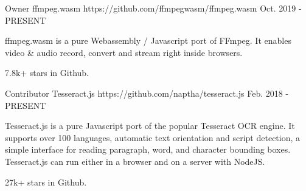 

\begin{cventries}

  \cventry
    {Owner} %
    {ffmpeg.wasm} %
    {https://github.com/ffmpegwasm/ffmpeg.wasm} %
    {Oct. 2019 - PRESENT} %
    {
      \begin{cvitems} %
        \item {ffmpeg.wasm is a pure Webassembly / Javascript port of FFmpeg. It enables video \& audio record, convert and stream right inside browsers.}
        \item {7.8k+ stars in Github.}
      \end{cvitems}
    }

  \cventry
    {Contributor} %
    {Tesseract.js} %
    {https://github.com/naptha/tesseract.js} %
    {Feb. 2018 - PRESENT} %
    {
      \begin{cvitems} %
        \item {Tesseract.js is a pure Javascript port of the popular Tesseract OCR engine. It supports over 100 languages, automatic text orientation and script detection, a simple interface for reading paragraph, word, and character bounding boxes. Tesseract.js can run either in a browser and on a server with NodeJS.}
        \item {27k+ stars in Github.}
      \end{cvitems}
    }



\end{cventries}
